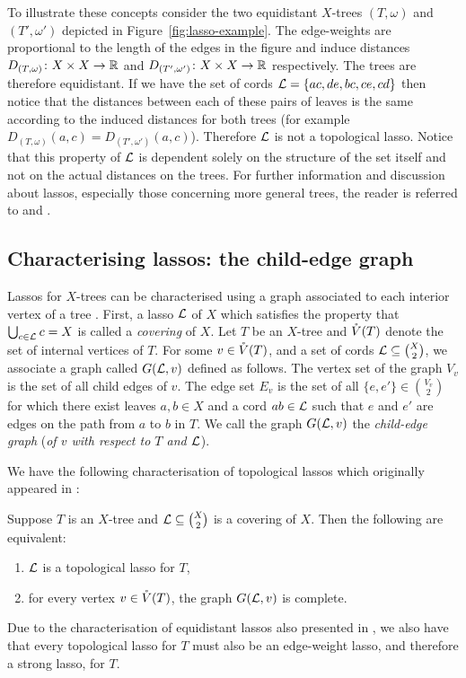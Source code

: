 To illustrate these concepts consider the two equidistant $X$-trees
$(T,\omega)$ and $(T',\omega')$ depicted in Figure~\ref{fig:lasso-example}.
The edge-weights are proportional to the length of the edges in the figure and
induce distances $D_{(T,\omega)} \colon X \times X \to {\mathbb R}$ and
$D_{(T',\omega')} \colon X \times X \to {\mathbb R}$ respectively.  The trees are
therefore equidistant.  If we have the set of cords ${\mathcal L}=\{ac,de,bc,ce,cd\}$
then notice that the distances between each of these pairs of leaves is the
same according to the induced distances for both trees (for example
$D_{(T,\omega)}(a,c) = D_{(T',\omega')}(a,c)$).  Therefore ${\mathcal L}$ is not a
topological lasso.  Notice that this property of ${\mathcal L}$ is dependent solely on
the structure of the set itself and not on the actual distances on the trees.
For further information and discussion about lassos, especially those
concerning more general trees, the reader is referred to
\cite{dress11lassoing} and \cite{huber2014tree}.

\subsection{Characterising lassos: the child-edge graph}
\label{sec:lassoing-rooted-x}

Lassos for $X$-trees can be characterised using a graph associated to each
interior vertex of a tree \cite{huber13lassoing}.  First, a lasso ${\mathcal L}$ of $X$
which satisfies the property that $\bigcup_{c \in {\mathcal L}} c = X$ is called a
\textit{covering} of $X$.  Let $T$ be an $X$-tree and $\mathring{V}(T)$ denote the set
of internal vertices of $T$.  For some $v \in \mathring{V}(T)$, and a set of cords ${\mathcal L}
\subseteq {X \choose 2}$, we associate a graph called $G({\mathcal L},v)$ defined as
follows.  The vertex set of the graph $V_v$ is the set of all child edges of
$v$.  The edge set $E_v$ is the set of all $\{e,e'\} \in {V_v \choose 2}$ for
which there exist leaves $a,b \in X$ and a cord $ab \in {\mathcal L}$ such that $e$ and
$e'$ are edges on the path from $a$ to $b$ in $T$.  We call the graph
$G({\mathcal L},v)$ the \textit{child-edge graph} (\textit{of $v$ with respect to $T$
  and ${\mathcal L}$}).

We have the following characterisation of topological lassos which originally
appeared in \cite{huber13lassoing}:
\begin{thm}
  \label{thm:child-edge-graph-complete}
  Suppose $T$ is an $X$-tree and ${\mathcal L} \subseteq {X \choose 2}$ is a covering
  of $X$.  Then the following are equivalent:
  \begin{enumerate}
  \item ${\mathcal L}$ is a topological lasso for $T$,
  \item for every vertex $v \in \mathring{V}(T)$, the graph $G({\mathcal L},v)$ is complete.
  \end{enumerate}
\end{thm}

Due to the characterisation of equidistant lassos also presented in
\cite{huber13lassoing}, we also have that every topological lasso for $T$ must also be an
edge-weight lasso, and therefore a strong lasso, for $T$.

